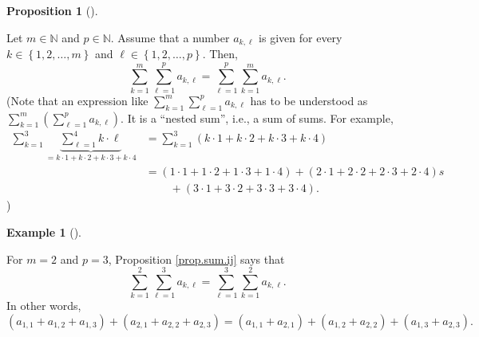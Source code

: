 \documentclass[numbers=enddot,12pt,final,onecolumn,notitlepage]{scrartcl}%
\theoremstyle{definition}
\newtheorem{prop}[theo]{Proposition}
\newenvironment{proposition}[1][]
{\begin{prop}[#1]\begin{leftbar}}
{\end{leftbar}\end{prop}}
\newtheorem{exam}[theo]{Example}
\newenvironment{example}[1][]
{\begin{exam}[#1]\begin{leftbar}}
{\end{leftbar}\end{exam}}
\let\sumnonlimits\sum
\renewcommand{\sum}{\sumnonlimits\limits}
\begin{document}
\begin{proposition}
\label{prop.sum.ij}Let $m\in\mathbb{N}$ and $p\in\mathbb{N}$. Assume that a
number $a_{k,\ell}$ is given for every $k\in\left\{  1,2,\ldots,m\right\}  $
and $\ell\in\left\{  1,2,\ldots,p\right\}  $. Then,%
\[
\sum_{k=1}^{m}\sum_{\ell=1}^{p}a_{k,\ell}=\sum_{\ell=1}^{p}\sum_{k=1}%
^{m}a_{k,\ell}.
\]
(Note that an expression like $\sum_{k=1}^{m}\sum_{\ell=1}^{p}a_{k,\ell}$ has
to be understood as $\sum_{k=1}^{m}\left(  \sum_{\ell=1}^{p}a_{k,\ell}\right)
$. It is a \textquotedblleft nested sum\textquotedblright, i.e., a sum of
sums. For example,%
\begin{align*}
\sum_{k=1}^{3}\underbrace{\sum_{\ell=1}^{4}k\cdot\ell}_{=k\cdot1+k\cdot
2+k\cdot3+k\cdot4}  &  =\sum_{k=1}^{3}\left(  k\cdot1+k\cdot2+k\cdot
3+k\cdot4\right) \\
&  =\left(  1\cdot1+1\cdot2+1\cdot3+1\cdot4\right)  +\left(  2\cdot
1+2\cdot2+2\cdot3+2\cdot4\right)  s\\
&  \ \ \ \ \ \ \ \ \ \ +\left(  3\cdot1+3\cdot2+3\cdot3+3\cdot4\right)  .
\end{align*}
)
\end{proposition}

\begin{example}
For $m=2$ and $p=3$, Proposition \ref{prop.sum.ij} says that%
\[
\sum_{k=1}^{2}\sum_{\ell=1}^{3}a_{k,\ell}=\sum_{\ell=1}^{3}\sum_{k=1}%
^{2}a_{k,\ell}.
\]
In other words,%
\[
\left(  a_{1,1}+a_{1,2}+a_{1,3}\right)  +\left(  a_{2,1}+a_{2,2}%
+a_{2,3}\right)  =\left(  a_{1,1}+a_{2,1}\right)  +\left(  a_{1,2}%
+a_{2,2}\right)  +\left(  a_{1,3}+a_{2,3}\right)  .
\]

\end{example}
\end{document}
